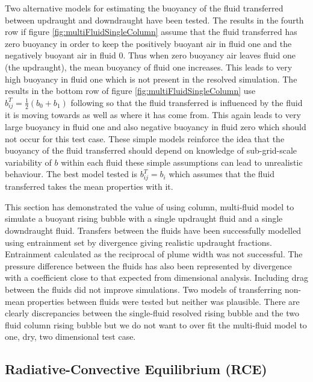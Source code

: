 \documentclass[draft]{agujournal2019}
\begin{document}
Two alternative models for estimating the buoyancy of the fluid transferred
between updraught and downdraught have been tested. The results in
the fourth row if figure \ref{fig:multiFluidSingleColumn} assume
that the fluid transferred has zero buoyancy in order to keep the
positively buoyant air in fluid one and the negatively buoyant air
in fluid 0. Thus when zero buoyancy air leaves fluid one (the updraught),
the mean buoyancy of fluid one increases. This leads to very high
buoyancy in fluid one which is not present in the resolved simulation.
The results in the bottom row of figure \ref{fig:multiFluidSingleColumn}
use $b_{ij}^{T}=\frac{1}{2}\left(b_{0}+b_{1}\right)$ following 
so that the fluid transferred is influenced by the fluid it is moving
towards as well as where it has come from. This again leads to very
large buoyancy in fluid one and also negative buoyancy in fluid zero
which should not occur for this test case. These simple models reinforce
the idea that the buoyancy of the fluid transferred should depend
on knowledge of sub-grid-scale variability of $b$ within each fluid
\textendash{} these simple assumptions can lead to unrealistic behaviour.
The best model tested is $b_{ij}^{T}=b_{i}$ which assumes that the
fluid transferred takes the mean properties with it.

This section has demonstrated the value of using  column,
multi-fluid model to simulate a buoyant rising bubble with a single
updraught fluid and a single downdraught fluid. Transfers between
the fluids have been successfully modelled using entrainment set by
divergence giving realistic updraught fractions. Entrainment calculated
as the reciprocal of plume width was not successful. The pressure
difference between the fluids has also been represented by divergence
with a coefficient close to that expected from dimensional analysis.
Including drag between the fluids did not improve simulations. Two
models of transferring non-mean properties between fluids were tested
but neither was plausible. There are clearly discrepancies between
the single-fluid resolved rising bubble and the two fluid  column
rising bubble but we do not want to over fit the multi-fluid model
to one, dry, two dimensional test case.

\subsection{Radiative-Convective Equilibrium (RCE)}
\end{document}
